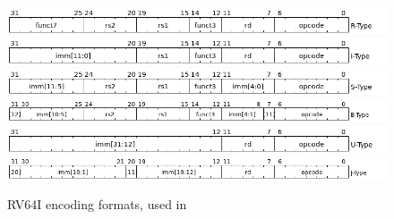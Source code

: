 \begin{figure}[t]
    \begin{centering}
        \includegraphics[width = \textwidth]{figures/2-RiscV/R.png}\\
        \includegraphics[width = \textwidth]{figures/2-RiscV/I.png}\\
        \includegraphics[width = \textwidth]{figures/2-RiscV/S.png}\\
        \includegraphics[width = \textwidth]{figures/2-RiscV/B.png}\\
        \includegraphics[width = \textwidth]{figures/2-RiscV/U.png}\\
        \includegraphics[width = \textwidth]{figures/2-RiscV/J.png}
        \caption[RV64I encoding formats]{RV64I encoding formats, used in \cite[Chapter 2.3]{riscv-isa}}
        \label{fig:rv64i_formats}
    \end{centering}
\end{figure}
